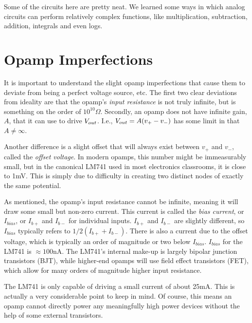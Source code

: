 Some of the circuits here are pretty neat. We learned some ways in which analog circuits can perform relatively complex functions, like multiplication, subtraction, addition, integrals and even logs. 


\section{Opamp Imperfections}

It is important to understand the slight opamp imperfections that cause them to deviate from being a perfect voltage source, etc. The first two clear deviations from ideality are that the opamp's \textit{input resistance} is not truly infinite, but is something on the order of $10^{10}\Omega$. Secondly, an opamp does not have infinite gain, $A$, that it can use to drive ${V}_{out}$. I.e., ${V}_{out} = A(v_+ - v_-)$ has some limit in that $A \neq \infty$.\newline

Another difference is a slight offset that will always exist between $v_+$ and $v_-$, called the \textit{offset voltage}. In modern opamps, this number might be immeasurably small, but in the canonical LM741 used in most electronics classrooms, it is close to 1mV. This is simply due to difficulty in creating two distinct nodes of exactly the same potential. \newline

As mentioned, the opamp's input resistance cannot be infinite, meaning it will draw some small but non-zero current. This current is called the \textit{bias current}, or $I_{bias}$, or $I_{b+}$ and $I_{b-}$ for individual inputs. $I_{b+}$ and $I_{b-}$ are slightly different, so $I_{bias}$ typically refers to $1/2 (I_{b+} + I_{b-})$. There is also a current due to the offset voltage, which is typically an order of magnitude or two below $I_{bias}$. $I_{bias}$ for the LM741 is $\approx 100$nA. The LM741's internal make-up is largely bipolar junction transistors (BJT), while higher-end opamps will use field effect transistors (FET), which allow for many orders of magnitude higher input resistance. \newline

The LM741 is only capable of driving a small current of about 25mA. This is actually a very considerable point to keep in mind. Of course, this means an opamp cannot directly power any meaningfully high power devices without the help of some external transistors.\newline


